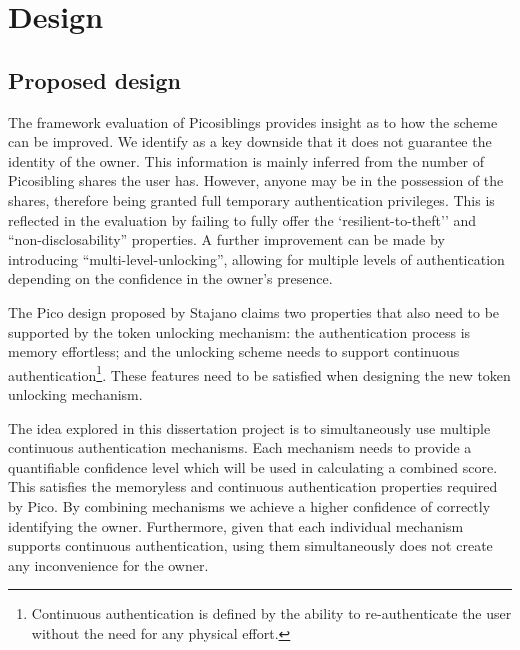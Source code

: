 
\chapter{Design} %

\label{Chapter3} %


\section{Proposed design}
The framework evaluation of Picosiblings provides insight as to how the scheme can be improved. We identify as a key downside that it does not guarantee the identity of the owner. This information is mainly inferred from the number of Picosibling shares the user has. However, anyone may be in the possession of the shares, therefore being granted full temporary authentication privileges. This is reflected in the evaluation by failing to fully offer the `resilient-to-theft'' and ``non-disclosability'' properties. A further improvement can be made by introducing ``multi-level-unlocking'', allowing for multiple levels of authentication depending on the confidence in the owner's presence.

The Pico design proposed by Stajano \cite{stajano2011pico} claims two properties that also need to be supported by the token unlocking mechanism: the authentication process is memory effortless; and the unlocking scheme needs to support continuous authentication\footnote{Continuous authentication is defined by the ability to re-authenticate the user without the need for any physical effort.}. These features need to be satisfied when designing the new token unlocking mechanism.

The idea explored in this dissertation project is to simultaneously use multiple continuous authentication mechanisms. Each mechanism needs to provide a quantifiable confidence level which will be used in calculating a combined score. This satisfies the memoryless and continuous authentication properties required by Pico. By combining mechanisms we achieve a higher confidence of correctly identifying the owner. Furthermore, given that each individual mechanism supports continuous authentication, using them simultaneously does not create any inconvenience for the owner.

